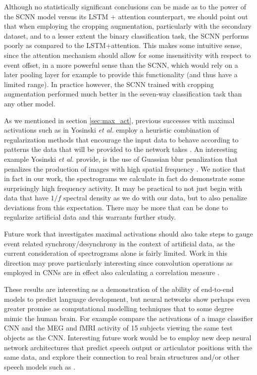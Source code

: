 \documentclass[fleqn,10pt]{wlscirep}
\begin{document}
Although no statistically significant conclusions can be made as to the power of the SCNN model versus its LSTM + attention counterpart, we should point out that when employing the cropping augmentation, particularly with the secondary dataset, and to a lesser extent the binary classification task, the SCNN performs poorly as compared to the LSTM+attention. This makes some intuitive sense, since the attention mechanism should allow for some insensitivity with respect to event offset, in a more powerful sense than the SCNN, which would rely on a later pooling layer for example to provide this functionality (and thus have a limited range). In practice however, the SCNN trained with cropping augmentation performed much better in the seven-way classification task than any other model.

As we mentioned in section \ref{sec:max_act}, previous successes with maximal activations such as in Yosinski {\em et al.} employ a heuristic combination of regularization methods that encourage the input data to behave according to patterns the data that will be provided to the network takes \cite{Yosinski2015}. An interesting example Yosinski {\em et al.} provide, is the use of Guassian blur penalization that penalizes the production of images with high spatial frequency \cite{Yosinski2015}. We notice that in fact in our work, the spectrograms we calculate in fact do demonstrate some surprisingly high frequency activity. It may be practical to not just begin with data that have $1/f$ spectral density as we do with our data, but to also penalize deviations from this expectation. There may be more that can be done to regularize artificial data and this warrants further study.

Future work that investigates maximal activations should also take steps to gauge event related synchrony/desynchrony in the context of artificial data, as the current consideration of spectrograms alone is fairly limited. Work in this direction may prove particularly interesting since convolution operations as employed in CNNs are in effect also calculating a correlation measure \cite{GravesRNNBook}.

These results are interesting as a demonstration of the ability of end-to-end models to predict language development, but neural networks show perhaps even greater promise as computational modelling techniques that to some degree mimic the human brain. For example \cite{cichy2016} compare the activations of a image classifier CNN and the MEG and fMRI activity of 15 subjects viewing the same test objects as the CNN. Interesting future work would be to employ new deep neural network architectures that predict speech output or articulator positions with the same data, and explore their connection to real brain structures and/or other speech models such as \cite{Guenther2005}.
\end{document}
